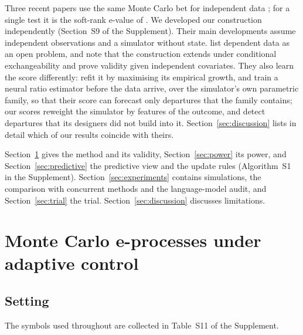 \documentclass[12pt]{article}
\theoremstyle{remark}
\begin{document}
Three recent papers use the same Monte Carlo bet for independent data
\citep{dombowsky2026besag,forre2026anytime,cortinovis2026slice}; for a single
test it is the soft-rank e-value of \citet{wang2022false}. We developed our
construction independently (Section~S9 of the Supplement). Their main
developments assume independent observations and a simulator without state.
\citet{forre2026anytime} list dependent data as an open problem, and
\citet[Appendix~C.1.1]{cortinovis2026slice} note that the construction extends
under conditional exchangeability and prove validity given independent
covariates. They also learn the score differently: \citet{forre2026anytime}
refit it by maximising its empirical growth, and \citet{cortinovis2026slice}
train a neural ratio estimator before the data arrive, over the simulator's own
parametric family, so that their score can forecast only departures that the
family contains; our scores reweight the simulator by features of the outcome,
and detect departures that its designers did not build into it.
Section~\ref{sec:discussion} lists in detail which of our results coincide
with theirs.

Section~\ref{sec:method} gives the method and its validity,
Section~\ref{sec:power} its power, and Section~\ref{sec:predictive} the
predictive view and the update rules (Algorithm~S1 in the Supplement). Section~\ref{sec:experiments}
contains simulations, the comparison with concurrent methods and the
language-model audit, and Section~\ref{sec:trial} the trial.
Section~\ref{sec:discussion} discusses limitations.

\section{Monte Carlo e-processes under adaptive control}\label{sec:method}

\subsection{Setting}\label{sec:setting}

The symbols used throughout are collected in Table~S11 of the
Supplement.
\end{document}
